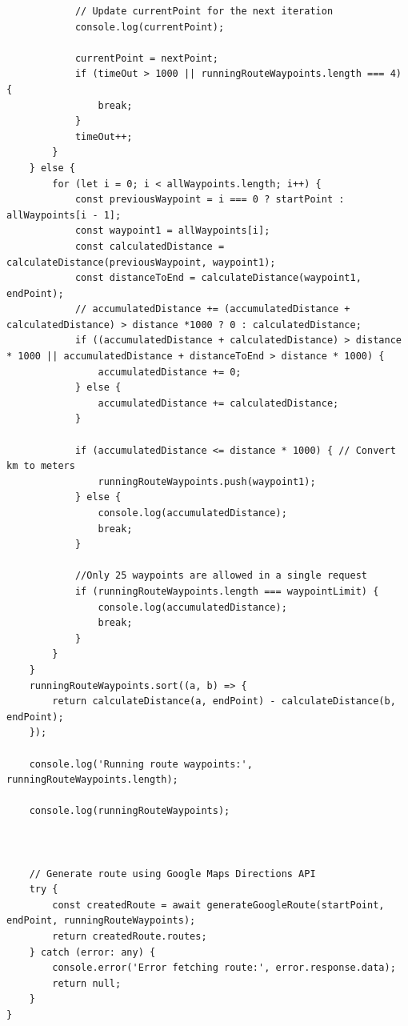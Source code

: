 \begin{lstlisting}
            // Update currentPoint for the next iteration
            console.log(currentPoint);

            currentPoint = nextPoint;
            if (timeOut > 1000 || runningRouteWaypoints.length === 4) {
                break;
            }
            timeOut++;
        }
    } else {
        for (let i = 0; i < allWaypoints.length; i++) {
            const previousWaypoint = i === 0 ? startPoint : allWaypoints[i - 1];
            const waypoint1 = allWaypoints[i];
            const calculatedDistance = calculateDistance(previousWaypoint, waypoint1);
            const distanceToEnd = calculateDistance(waypoint1, endPoint);
            // accumulatedDistance += (accumulatedDistance + calculatedDistance) > distance *1000 ? 0 : calculatedDistance;
            if ((accumulatedDistance + calculatedDistance) > distance * 1000 || accumulatedDistance + distanceToEnd > distance * 1000) {
                accumulatedDistance += 0;
            } else {
                accumulatedDistance += calculatedDistance;
            }

            if (accumulatedDistance <= distance * 1000) { // Convert km to meters
                runningRouteWaypoints.push(waypoint1);
            } else {
                console.log(accumulatedDistance);
                break;
            }

            //Only 25 waypoints are allowed in a single request
            if (runningRouteWaypoints.length === waypointLimit) {
                console.log(accumulatedDistance);
                break;
            }
        }
    }
    runningRouteWaypoints.sort((a, b) => {
        return calculateDistance(a, endPoint) - calculateDistance(b, endPoint);
    });

    console.log('Running route waypoints:', runningRouteWaypoints.length);

    console.log(runningRouteWaypoints);



    // Generate route using Google Maps Directions API
    try {
        const createdRoute = await generateGoogleRoute(startPoint, endPoint, runningRouteWaypoints);
        return createdRoute.routes;
    } catch (error: any) {
        console.error('Error fetching route:', error.response.data);
        return null;
    }
}
\end{lstlisting}

